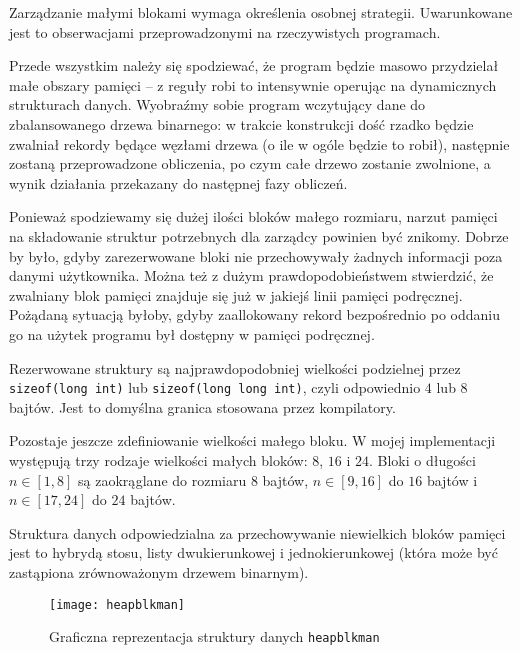 \documentclass[12pt,a4paper,titlepage,twoside]{mwart}
\begin{document}
Zarządzanie małymi blokami wymaga określenia osobnej strategii. Uwarunkowane
jest to obserwacjami przeprowadzonymi na rzeczywistych programach.

Przede wszystkim należy się spodziewać, że program będzie masowo przydzielał
małe obszary pamięci -- z reguły robi to intensywnie operując na dynamicznych
strukturach danych. Wyobraźmy sobie program wczytujący dane do zbalansowanego
drzewa binarnego: w trakcie konstrukcji dość rzadko będzie zwalniał rekordy
będące węzłami drzewa (o ile w ogóle będzie to robił), następnie zostaną
przeprowadzone obliczenia, po czym całe drzewo zostanie zwolnione, a wynik
działania przekazany do następnej fazy obliczeń.

Ponieważ spodziewamy się dużej ilości bloków małego rozmiaru, narzut pamięci na
składowanie struktur potrzebnych dla zarządcy powinien być znikomy. Dobrze by
było, gdyby zarezerwowane bloki nie przechowywały żadnych informacji poza
danymi użytkownika. Można też z dużym prawdopodobieństwem stwierdzić, że
zwalniany blok pamięci znajduje się już w jakiejś linii pamięci podręcznej.
Pożądaną sytuacją byłoby, gdyby zaallokowany rekord bezpośrednio po oddaniu go
na użytek programu był dostępny w pamięci podręcznej.

Rezerwowane struktury są najprawdopodobniej wielkości podzielnej przez
\texttt{sizeof(long int)} lub \texttt{sizeof(long long int)}, czyli odpowiednio
$4$ lub $8$ bajtów. Jest to domyślna granica stosowana przez kompilatory.

Pozostaje jeszcze zdefiniowanie wielkości małego bloku. W mojej implementacji
występują trzy rodzaje wielkości małych bloków: $8$, $16$ i $24$. Bloki o
długości $n \in [1,8]$ są zaokrąglane do rozmiaru $8$ bajtów, $n \in [9,16]$ do
$16$ bajtów i $n \in [17,24]$ do $24$ bajtów.

Struktura danych odpowiedzialna za przechowywanie niewielkich bloków pamięci
jest to hybrydą stosu, listy dwukierunkowej i jednokierunkowej (która może być
zastąpiona zrównoważonym drzewem binarnym).

\begin{figure}[h]
\centering
\texttt{[image: heapblkman]}
\caption{Graficzna reprezentacja struktury danych \texttt{heapblkman}}
\end{figure}
\end{document}
